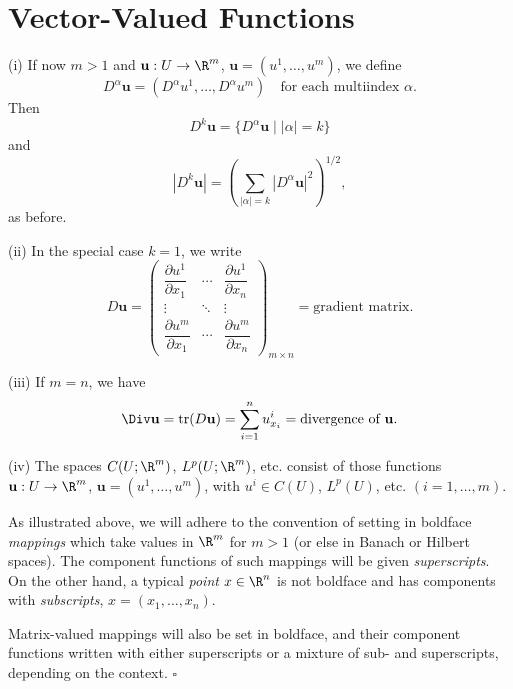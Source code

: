 \section{Vector-Valued Functions}
\label{sec:vector-valued-functions}

\begin{definition}
\label{def:vector-valued-function-notation}
(i) If now $m > 1$ and $\mathbf{u} : U \to \R^m$, $\mathbf{u} = (u^1, \ldots, u^m)$, we define
$$D^\alpha \mathbf{u} = (D^\alpha u^1, \ldots, D^\alpha u^m) \quad \text{for each multiindex } \alpha.$$
Then
$$D^k \mathbf{u} = \{D^\alpha \mathbf{u} \mid |\alpha| = k\}$$
and
$$|D^k \mathbf{u}| = \left(\sum_{|\alpha|=k} |D^\alpha \mathbf{u}|^2\right)^{1/2},$$
as before.

(ii) In the special case $k = 1$, we write
$$D\mathbf{u} = \begin{pmatrix} \dfrac{\partial u^1}{\partial x_1} & \cdots & \dfrac{\partial u^1}{\partial x_n} \\[1em] \vdots & \ddots & \vdots \\[0.5em] \dfrac{\partial u^m}{\partial x_1} & \cdots & \dfrac{\partial u^m}{\partial x_n} \end{pmatrix}_{m \times n} = \text{gradient matrix}.$$

(iii) If $m = n$, we have
$$\Div \mathbf{u} = \text{tr}(D\mathbf{u}) = \sum_{i=1}^{n} u^i_{x_i} = \text{divergence of } \mathbf{u}.$$

(iv) The spaces $C(U;\R^m)$, $L^p(U;\R^m)$, etc. consist of those functions $\mathbf{u} : U \to \R^m$, $\mathbf{u} = (u^1, \ldots, u^m)$, with $u^i \in C(U)$, $L^p(U)$, etc. $(i = 1, \ldots, m)$.
\end{definition}

\begin{remark}
\label{rem:boldface-convention-sub-superscripts}
As illustrated above, we will adhere to the convention of setting in boldface \textit{mappings} which take values in $\R^m$ for $m > 1$ (or else in Banach or Hilbert spaces). The component functions of such mappings will be given \textit{superscripts}. On the other hand, a typical \textit{point} $x \in \R^n$ is not boldface and has components with \textit{subscripts}, $x = (x_1, \ldots, x_n)$.

Matrix-valued mappings will also be set in boldface, and their component functions written with either superscripts or a mixture of sub- and superscripts, depending on the context. $\square$
\end{remark}

